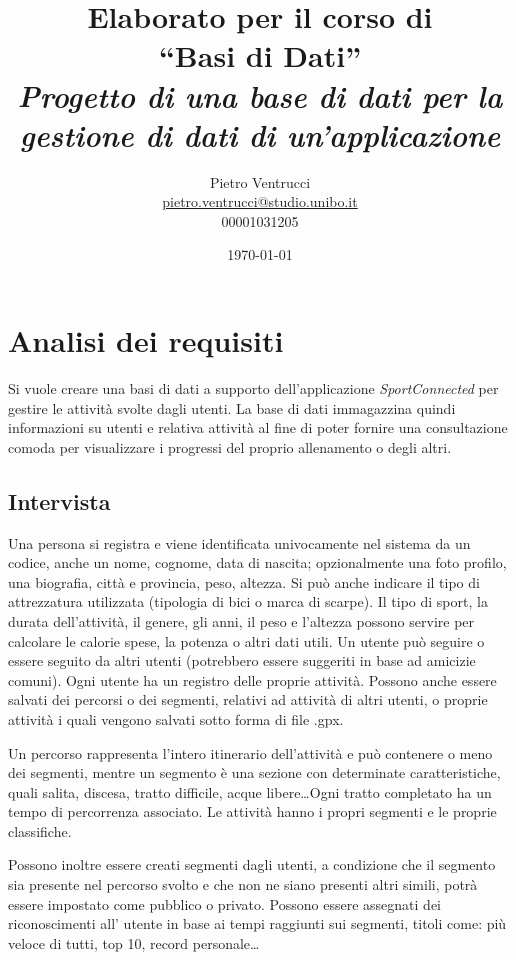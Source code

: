 \documentclass[12pt]{report}
\title{Elaborato per il corso di\\``Basi di Dati''\\[0.3in]
	\large \it Progetto di una base di dati per la gestione di dati di un'applicazione
}
\author{Pietro Ventrucci\\\href{mailto:pietro.ventrucci@studio.unibo.it}{pietro.ventrucci@studio.unibo.it}\\00001031205}
\date{\today}
\begin{document}
\maketitle

\tableofcontents

\chapter{Analisi dei requisiti}

Si vuole creare una basi di dati a supporto dell'applicazione \emph{SportConnected} per gestire le attività
svolte dagli utenti. La base di dati immagazzina quindi informazioni su utenti e relativa attività al fine
di poter fornire una consultazione comoda per visualizzare i progressi del proprio allenamento o degli altri.

\section{Intervista}
Una persona si registra e viene identificata univocamente nel sistema da un codice, anche un nome, cognome, 
data di nascita; opzionalmente una foto profilo, una biografia, città e provincia, peso, altezza. 
Si può anche indicare il tipo di attrezzatura utilizzata (tipologia di bici o marca di scarpe).
Il tipo di sport, la durata dell'attività, il genere, gli anni, il peso e l'altezza possono servire per
calcolare le calorie spese, la potenza o altri dati utili. Un utente può seguire o essere seguito da altri 
utenti (potrebbero essere suggeriti in base ad amicizie comuni). Ogni utente ha un registro delle proprie 
attività. Possono anche essere salvati dei percorsi o dei segmenti, relativi ad attività di altri utenti, 
o proprie attività i quali vengono salvati sotto forma di file .gpx.

Un percorso rappresenta l'intero itinerario dell'attività e può contenere o meno dei segmenti, mentre un 
segmento è una sezione con determinate caratteristiche, quali salita, discesa, tratto difficile, 
acque libere\dots Ogni tratto completato ha un tempo di percorrenza associato. Le attività hanno i 
propri segmenti e le proprie classifiche.

Possono inoltre essere creati segmenti dagli utenti, a condizione che 
il segmento sia presente nel percorso svolto e che non ne siano presenti altri simili, potrà essere 
impostato come pubblico o privato. Possono essere assegnati dei riconoscimenti all' utente in base ai 
tempi raggiunti sui segmenti, titoli come: più veloce di tutti, top 10, record personale\dots
\end{document}
